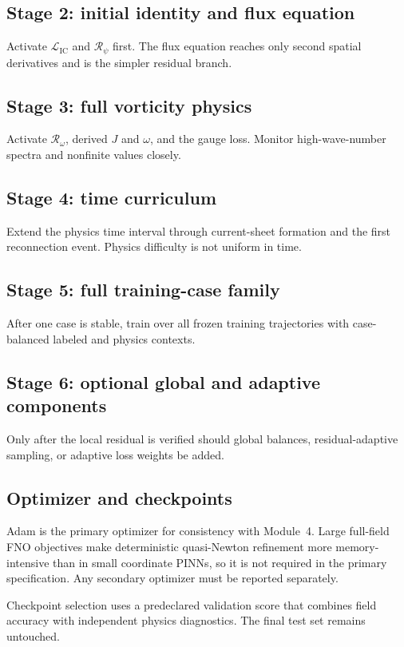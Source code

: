 \documentclass[11pt]{article}
\newcommand{\Rpsi}{\mathcal{R}_{\psi}}
\newcommand{\Romega}{\mathcal{R}_{\omega}}
\newcommand{\Lic}{\mathcal{L}_{\mathrm{IC}}}
\begin{document}
\subsection{Stage 2: initial identity and flux equation}
Activate $\Lic$ and $\Rpsi$ first. The flux equation reaches only second spatial derivatives and is the simpler residual branch.

\subsection{Stage 3: full vorticity physics}
Activate $\Romega$, derived $J$ and $\omega$, and the gauge loss. Monitor high-wave-number spectra and nonfinite values closely.

\subsection{Stage 4: time curriculum}
Extend the physics time interval through current-sheet formation and the first reconnection event. Physics difficulty is not uniform in time.

\subsection{Stage 5: full training-case family}
After one case is stable, train over all frozen training trajectories with case-balanced labeled and physics contexts.

\subsection{Stage 6: optional global and adaptive components}
Only after the local residual is verified should global balances, residual-adaptive sampling, or adaptive loss weights be added.

\subsection{Optimizer and checkpoints}
Adam is the primary optimizer for consistency with Module~4. Large full-field FNO objectives make deterministic quasi-Newton refinement more memory-intensive than in small coordinate PINNs, so it is not required in the primary specification. Any secondary optimizer must be reported separately.

Checkpoint selection uses a predeclared validation score that combines field accuracy with independent physics diagnostics. The final test set remains untouched.
\end{document}

